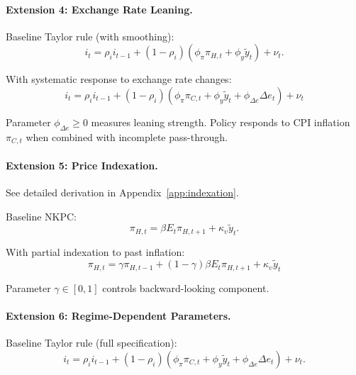 \documentclass[12pt,a4paper]{article}
\begin{document}
\begin{appendices}
\paragraph{Extension 4: Exchange Rate Leaning.}
Baseline Taylor rule (with smoothing):
\begin{equation}
	i_t = \rho_i i_{t-1} + (1-\rho_i)(\phi_\pi\pi_{H,t} + \phi_y\tilde{y}_t) + \nu_t.
	\tag{No ER leaning}
\end{equation}

With systematic response to exchange rate changes:
\begin{equation}
	\boxed{i_t = \rho_i i_{t-1} + (1-\rho_i)(\phi_\pi\pi_{C,t} + \phi_y\tilde{y}_t + \phi_{\Delta e}\Delta e_t) + \nu_t}
	\label{eq:app_taylor_fx}
	\tag{With ER leaning}
\end{equation}

Parameter $\phi_{\Delta e} \geq 0$ measures leaning strength. Policy responds to CPI inflation $\pi_{C,t}$ when combined with incomplete pass-through.

\paragraph{Extension 5: Price Indexation.}
See detailed derivation in Appendix~\ref{app:indexation}.

Baseline NKPC:
\begin{equation}
	\pi_{H,t} = \beta E_t\pi_{H,t+1} + \kappa_\upsilon\tilde{y}_t.
	\tag{Baseline}
\end{equation}

With partial indexation to past inflation:
\begin{equation}
	\boxed{\pi_{H,t} = \gamma\pi_{H,t-1} + (1-\gamma)\beta E_t\pi_{H,t+1} + \kappa_\upsilon\tilde{y}_t}
	\label{eq:app_nkpc_index}
	\tag{With indexation}
\end{equation}

Parameter $\gamma \in [0,1]$ controls backward-looking component.

\paragraph{Extension 6: Regime-Dependent Parameters.}
Baseline Taylor rule (full specification):
\begin{equation}
	i_t = \rho_i i_{t-1} + (1-\rho_i)(\phi_\pi\pi_{C,t} + \phi_y\tilde{y}_t + \phi_{\Delta e}\Delta e_t) + \nu_t.
	\tag{Fixed parameters}
\end{equation}


\end{appendices}
\end{document}
